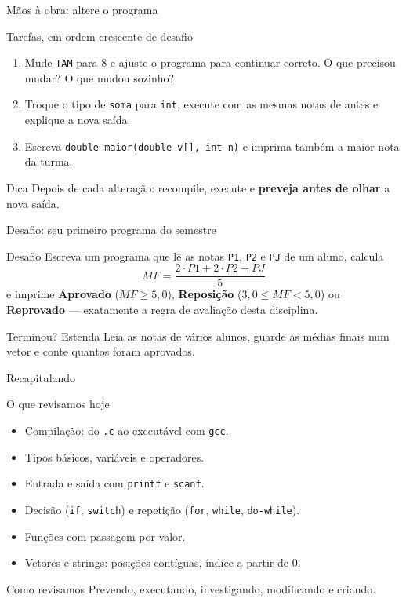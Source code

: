 \documentclass[aspectratio=169]{beamer}
\begin{document}
\begin{frame}{Mãos à obra: altere o programa}
  \begin{block}{Tarefas, em ordem crescente de desafio}
    \begin{enumerate}
      \item Mude \texttt{TAM} para 8 e ajuste o programa para continuar correto.
        O que precisou mudar? O que mudou sozinho?
      \item Troque o tipo de \texttt{soma} para \texttt{int}, execute com as
        mesmas notas de antes e explique a nova saída.
      \item Escreva \texttt{double maior(double v[], int n)} e imprima também
        a maior nota da turma.
    \end{enumerate}
  \end{block}
  \begin{exampleblock}{Dica}
    Depois de cada alteração: recompile, execute e \textbf{preveja antes de
    olhar} a nova saída.
  \end{exampleblock}
\end{frame}

\begin{frame}{Desafio: seu primeiro programa do semestre}
  \begin{block}{Desafio}
    Escreva um programa que lê as notas \texttt{P1}, \texttt{P2} e \texttt{PJ}
    de um aluno, calcula
    \[ MF = \frac{2 \cdot P1 + 2 \cdot P2 + PJ}{5} \]
    e imprime \textbf{Aprovado} ($MF \geq 5{,}0$), \textbf{Reposição}
    ($3{,}0 \leq MF < 5{,}0$) ou \textbf{Reprovado} --- exatamente a regra de
    avaliação desta disciplina.
  \end{block}
  \begin{exampleblock}{Terminou? Estenda}
    Leia as notas de vários alunos, guarde as médias finais num vetor e conte
    quantos foram aprovados.
  \end{exampleblock}
\end{frame}

\begin{frame}{Recapitulando}
  \begin{block}{O que revisamos hoje}
    \begin{itemize}
      \item Compilação: do \texttt{.c} ao executável com \texttt{gcc}.
      \item Tipos básicos, variáveis e operadores.
      \item Entrada e saída com \texttt{printf} e \texttt{scanf}.
      \item Decisão (\texttt{if}, \texttt{switch}) e repetição (\texttt{for}, \texttt{while}, \texttt{do-while}).
      \item Funções com passagem por valor.
      \item Vetores e strings: posições contíguas, índice a partir de 0.
    \end{itemize}
  \end{block}
  \begin{exampleblock}{Como revisamos}
    Prevendo, executando, investigando, modificando e criando.
  \end{exampleblock}
\end{frame}
\end{document}
